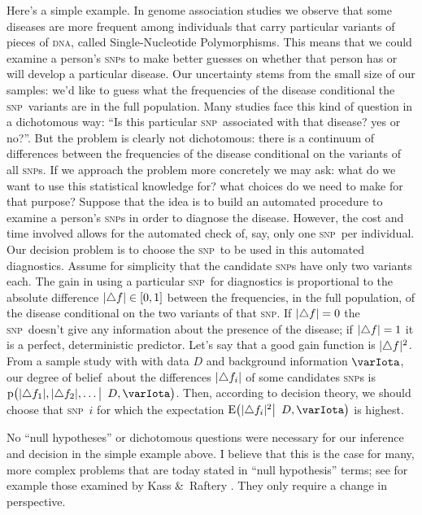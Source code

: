 \documentclass[\ifafour a4paper,12pt,\else a5paper,10pt,\fi%
onecolumn,oneside,article,%
british%
]{memoir}
\theoremstyle{remark}
\theoremstyle{innote}
\newcommand*{\citey}{\parencites*}
\newcommand*{\amp}{\&}
\newcommand*{\incr}{\triangle}%
\DeclarePairedDelimiter\clcl{[}{]}
\DeclarePairedDelimiter\abs{\lvert}{\rvert}
\newcommand*{\pf}{\mathrm{p}}%
\renewcommand*{\|}{\mathpunct{|}}
\newcommand*{\lcond}[1][]{\mathpunct{#1|\ }}%
\newcommand*{\sect}{\S}%
\newcommand*{\E}{\mathrm{E}}
\DeclarePairedDelimiter\expp{(}{)}
\newcommand*{\expe}{\E\expp}%
\newcommand*{\dob}{degree of belief}
\newcommand*{\yI}{\varIota}
\newcommand*{\yD}{D}
\newcommand*{\snp}{\textsc{snp}}
\begin{document}
Here's a simple example. In genome association studies we observe that some
diseases are more frequent among individuals that carry particular variants
of pieces of \textsc{dna}, called Single-Nucleotide Polymorphisms. This
means that we could examine a person's \snp s to make better guesses on
whether that person has or will develop a particular disease. Our
uncertainty stems from the small size of our samples: we'd like to guess
what the frequencies of the disease conditional the \snp\ variants are in
the full population. Many studies face this kind of question in a
dichotomous way: \enquote{Is this particular \snp\ associated with that
  disease? yes or no?}. %
But the problem is clearly not dichotomous: there is a continuum of
differences between the frequencies of the disease conditional on the
variants of all \snp s. If we approach the problem more concretely we may
ask: what do we want to use this statistical knowledge for? what choices do
we need to make for that purpose? Suppose that the idea is to build an
automated procedure to examine a person's \snp s in order to diagnose the
disease. However, the cost and time involved allows for the automated check
of, say, only one \snp\ per individual. Our decision problem is to choose
the \snp\ to be used in this automated diagnostics. Assume for simplicity
that the candidate \snp s have only two variants each. The gain in using a
particular \snp\ for diagnostics is proportional to the absolute difference
$\abs{\incr f} \in \clcl{0,1}$ between the frequencies, in the full
population, of the disease conditional on the two variants of that \snp. If
$\abs{\incr f} = 0$ the \snp\ doesn't give any information about the
presence of the disease; if $\abs{\incr f} = 1$ it is a perfect,
deterministic predictor. Let's say that a good gain function is
$\abs{\incr f}^2$. From a sample study with with data $\yD$ and background
information $\yI$, our \dob\ about the differences $\abs{\incr f_i}$ of
some candidates \snp s is
$\pf\bigl(\abs{\incr f_1}, \abs{\incr f_2}, \dotsc \lcond[\big] \yD,
\yI\bigr)$. Then, according to decision theory, we should choose that \snp\
$i$ for which the expectation
$\expe[\big]{\abs{\incr f_i}^2 \lcond[\big] \yD, \yI}$ is highest.

No \enquote{null hypotheses} or dichotomous questions were necessary for
our inference and decision in the simple example above. I believe that this
is the case for many, more complex problems that are today stated in
\enquote{null hypothesis} terms; see for example those examined by Kass
\amp\ Raftery \citey[\sect~2]{kassetal1995}. They only require a change in
perspective.
\end{document}
